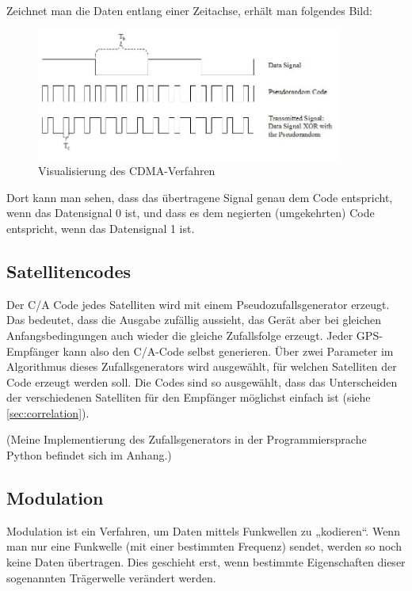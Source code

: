 \documentclass[12pt,a4paper]{scrartcl}
\begin{document}
Zeichnet man die Daten entlang einer Zeitachse, erhält man folgendes Bild:

\begin{figure}[H]
\centering
\includegraphics[width=0.9\textwidth]{img/Generation_of_CDMA.jpg}
\caption{Visualisierung des CDMA-Verfahren\cite{commons_cdma}}
\label{fig:cdma}
\end{figure}

Dort kann man sehen, dass das übertragene Signal genau dem Code entspricht, wenn das Datensignal 0 ist, und dass es dem negierten (umgekehrten) Code entspricht, wenn das Datensignal 1 ist.

\subsection{Satellitencodes}

Der C/A Code jedes Satelliten wird mit einem Pseudozufallsgenerator erzeugt. Das bedeutet, dass die Ausgabe zufällig aussieht, das Gerät aber bei gleichen Anfangsbedingungen auch wieder die gleiche Zufallsfolge erzeugt. Jeder GPS-Empfänger kann also den C/A-Code selbst generieren. Über zwei Parameter im Algorithmus dieses Zufallsgenerators wird ausgewählt, für welchen Satelliten der Code erzeugt werden soll. Die Codes sind so ausgewählt, dass das Unterscheiden der verschiedenen Satelliten für den Empfänger möglichst einfach ist (siehe \ref{sec:correlation}).

(Meine Implementierung des Zufallsgenerators in der Programmiersprache Python befindet sich im Anhang.)

\subsection{Modulation}

Modulation ist ein Verfahren, um Daten mittels Funkwellen zu „kodieren“.
Wenn man nur eine Funkwelle (mit einer bestimmten Frequenz) sendet, werden so noch keine Daten übertragen. Dies geschieht erst, wenn bestimmte Eigenschaften dieser sogenannten Trägerwelle verändert werden.
\end{document}
